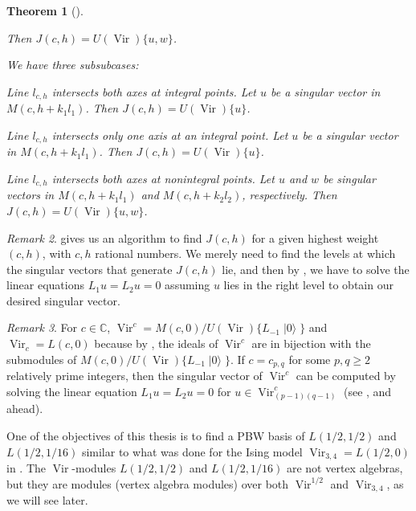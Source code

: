 \documentclass[a4paper, 12pt, reqno]{amsart}
\newtheorem{theorem}{Theorem}[section]
\theoremstyle{remark}
\newtheorem{remark}[theorem]{Remark}
\DeclareMathOperator{\Vir}{Vir}
\DeclareMathOperator{\vac}{|0\rangle}
\begin{document}
\begin{theorem}[{\cite{astashkevich_structure_1997}}]
\begin{description}[leftmargin = !]
\begin{description}[leftmargin = !]
\begin{description}[leftmargin = !]
        Then $J(c, h) = U(\Vir)\{u, w\}$.
      \end{description}
    \item[Subcase $c \ge 25$] We have three subsubcases:
      \begin{description}[leftmargin = !]
      \item[Subsubcase III$^{00}_+$] Line $l_{c, h}$ intersects both axes at integral points.
        Let $u$ be a singular vector in $M(c, h + k_1l_1)$.
        Then $J(c, h) = U(\Vir)\{u\}$.
      \item[Subsubcase III$^0_+$] Line $l_{c, h}$ intersects only one axis at an integral point.
        Let $u$ be a singular vector in $M(c, h + k_1l_1)$.
        Then $J(c, h) = U(\Vir)\{u\}$.
      \item[Subsubcase III$_+$] Line $l_{c, h}$ intersects both axes at nonintegral points.
        Let $u$ and $w$ be singular vectors in $M(c, h + k_1l_1)$ and $M(c, h + k_2l_2)$, respectively.
        Then $J(c, h) = U(\Vir)\{u, w\}$.
      \end{description}
    \end{description}
  \end{description}
\end{theorem}

\begin{remark}
  \label{rmk:30}
   gives us an algorithm to find $J(c, h)$ for a given highest weight $(c, h)$, with $c, h$ rational numbers.
  We merely need to find the levels at which the singular vectors that generate $J(c, h)$ lie, and then by , we have to solve the linear equations $L_1u = L_2 u = 0$ assuming $u$ lies in the right level to obtain our desired singular vector.
\end{remark}

\begin{remark}
  \label{rmk:31}
  For $c \in \mathbb{C}$, $\Vir^c = M(c, 0)/U(\Vir)\{L_{-1}\vac\}$ and $\Vir_c = L(c, 0)$ because by , the ideals of $\Vir^c$ are in bijection with the submodules of $M(c, 0)/U(\Vir)\{L_{-1}\vac\}$.
  If $c = c_{p, q}$ for some $p, q \ge 2$ relatively prime integers, then the singular vector of $\Vir^c$ can be computed by solving the linear equation $L_1u = L_2u = 0$ for $u \in \Vir^c_{(p - 1)(q - 1)}$ (see ,  and  ahead).
\end{remark}

One of the objectives of this thesis is to find a PBW basis of $L(1/2, 1/2)$ and $L(1/2, 1/16)$ similar to what was done for the Ising model $\Vir_{3, 4} = L(1/2, 0)$ in \cite{andrews_singular_2022}.
The $\Vir$-modules $L(1/2, 1/2)$ and $L(1/2, 1/16)$ are not vertex algebras, but they are modules (vertex algebra modules) over both $\Vir^{1/2}$ and $\Vir_{3, 4}$, as we will see later.
\end{document}
